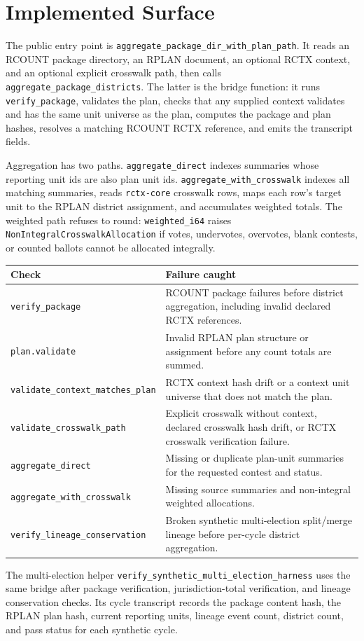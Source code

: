 \section{Implemented Surface}

The public entry point is
\texttt{aggregate\_package\_dir\_with\_plan\_path}. It reads an RCOUNT package
directory, an RPLAN document, an optional RCTX context, and an optional explicit
crosswalk path, then calls \texttt{aggregate\_package\_districts}. The latter is
the bridge function: it runs \texttt{verify\_package}, validates the plan,
checks that any supplied context validates and has the same unit universe as the
plan, computes the package and plan hashes, resolves a matching RCOUNT RCTX
reference, and emits the transcript fields.

Aggregation has two paths. \texttt{aggregate\_direct} indexes summaries whose
reporting unit ids are also plan unit ids. \texttt{aggregate\_with\_crosswalk}
indexes all matching summaries, reads \texttt{rctx-core} crosswalk rows, maps
each row's target unit to the RPLAN district assignment, and accumulates
weighted totals. The weighted path refuses to round: \texttt{weighted\_i64}
raises \texttt{NonIntegralCrosswalkAllocation} if votes, undervotes, overvotes,
blank contests, or counted ballots cannot be allocated integrally.

\begin{center}
\small
\begin{tabularx}{\textwidth}{lX}
\toprule
Check & Failure caught \\
\midrule
\texttt{verify\_package} & RCOUNT package failures before district aggregation, including invalid declared RCTX references. \\
\texttt{plan.validate} & Invalid RPLAN plan structure or assignment before any count totals are summed. \\
\texttt{validate\_context\_matches\_plan} & RCTX context hash drift or a context unit universe that does not match the plan. \\
\texttt{validate\_crosswalk\_path} & Explicit crosswalk without context, declared crosswalk hash drift, or RCTX crosswalk verification failure. \\
\texttt{aggregate\_direct} & Missing or duplicate plan-unit summaries for the requested contest and status. \\
\texttt{aggregate\_with\_crosswalk} & Missing source summaries and non-integral weighted allocations. \\
\texttt{verify\_lineage\_conservation} & Broken synthetic multi-election split/merge lineage before per-cycle district aggregation. \\
\bottomrule
\end{tabularx}
\end{center}

The multi-election helper \texttt{verify\_synthetic\_multi\_election\_harness}
uses the same bridge after package verification, jurisdiction-total
verification, and lineage conservation checks. Its cycle transcript records the
package content hash, the RPLAN plan hash, current reporting units, lineage
event count, district count, and pass status for each synthetic cycle.
